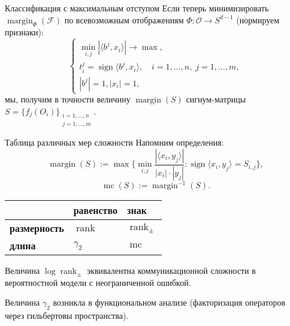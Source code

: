 \documentclass[handout]{beamer}
\DeclareMathOperator{\rank}{rank}
\DeclareMathOperator{\sign}{sign}
\DeclareMathOperator{\margin}{margin}
\DeclareMathOperator{\mc}{mc}
\begin{document}
\begin{frame}{Классификация с максимальным отступом}
    Если теперь минимизировать $\margin_\Phi(\mathcal F)$ по всевозможным
    отображениям $\Phi\colon\mathcal O\to S^{d-1}$ (нормируем признаки):
    \pause
    $$
    \begin{cases}
        \min_{i,j} |\langle b^j,x_i\rangle| \to \max,\\
        t_i^j = \sign \langle b^j,x_i\rangle,\quad i=1,\ldots,n,\;j=1,\ldots,m,\\
        |b^j|=1,|x_i|=1,
    \end{cases}
    $$
    \pause
    мы, получим в точности величину $\margin(S)$ сигнум-матрицы
    $S=\{f_j(O_i)\}_{\substack{i=1,\ldots,n\\j=1,\ldots,m}}$.

\end{frame}



\begin{frame}{Таблица различных мер сложности}
    Напомним определения:
    $$
    \margin(S) := \max\{ \min_{i,j} \frac{|\langle
    x_i,y_j\rangle|}{|x_i|\cdot|y_j|}\colon \sign \langle x_i,y_j\rangle =
    S_{i,j}\},
    $$
    \pause
    $$
    \mc(S) := \margin^{-1}(S).
    $$
    \pause

    \begin{tabular}{|l|l|l|}
        \hline
                             & \textbf{равенство}   & \textbf{знак} \\
        \hline
        \textbf{размерность} & $\rank$              & $\rank_\pm$ \\
        \hline
        \textbf{длина}       & $\gamma_2$           & $\mc$ \\
        \hline
    \end{tabular}
    \pause\vspace{5pt}

    Величина $\log\rank_\pm$ эквивалентна коммуникационной сложности в
    вероятностной модели с неограниченной ошибкой.
    \pause\vspace{5pt}

    Величина $\gamma_2$ возникла в функциональном анализе (факторизация
    операторов через гильбертовы пространства).

\end{frame}
\end{document}
